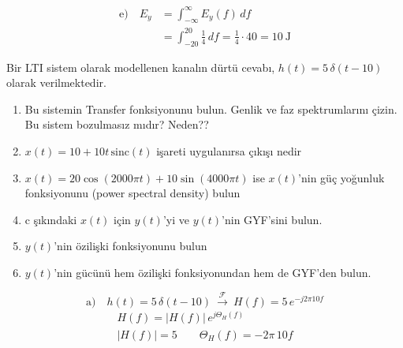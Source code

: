 \documentclass[11pt,a4paper]{article}
\begin{document}
\begin{center}
\end{center}

\begin{align*}
\text{e)}\quad E_y&=\int_{-\infty}^{\infty}E_y(f)\,df\\
&=\int_{-20}^{20}\frac{1}{4}\,df=\frac{1}{4}\cdot 40=10\ \mathrm{J}
\end{align*}

\begin{ornek}
Bir LTI sistem olarak modellenen kanalın dürtü cevabı, $h(t)=5\,\delta(t-10)$ olarak verilmektedir.
\begin{enumerate}[label=\alph*)]
\item Bu sistemin Transfer fonksiyonunu bulun. Genlik ve faz spektrumlarını çizin. \\ Bu sistem bozulmasız mıdır? Neden??
\item $x(t)=10+10t\,\mathrm{sinc}(t)$ işareti uygulanırsa çıkışı nedir
\item $x(t)=20\cos(2000\pi t)+10\sin(4000\pi t)$ ise $x(t)$'nin güç yoğunluk fonksiyonunu (power spectral density) bulun
\item c şıkındaki $x(t)$ için $y(t)$'yi ve $y(t)$'nin GYF'sini bulun.
\item $y(t)$'nin özilişki fonksiyonunu bulun
\item $y(t)$'nin gücünü hem özilişki fonksiyonundan hem de GYF'den bulun.
\end{enumerate}
\end{ornek}

\[ \text{a)}\quad h(t)=5\,\delta(t-10)\ \overset{\mathcal F}{\longrightarrow}\ H(f)=5\,e^{-j2\pi 10f} \]
\begin{gather*}
H(f)=|H(f)|\,e^{j\Theta_H(f)}\\
|H(f)|=5 \qquad \Theta_H(f)=-2\pi\,10f
\end{gather*}

\begin{center}
\end{center}
\end{document}
